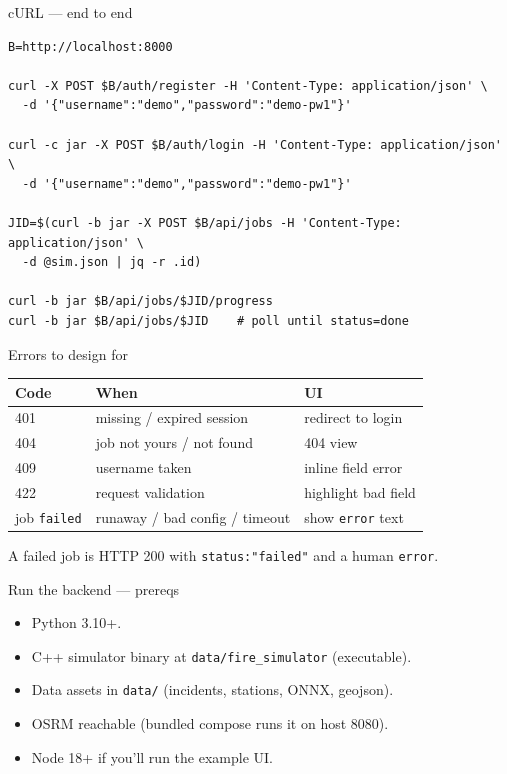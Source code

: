 \documentclass[aspectratio=169,11pt]{beamer}
\begin{document}
\begin{frame}[fragile]{cURL — end to end}
\begin{lstlisting}[language=shell]
B=http://localhost:8000

curl -X POST $B/auth/register -H 'Content-Type: application/json' \
  -d '{"username":"demo","password":"demo-pw1"}'

curl -c jar -X POST $B/auth/login -H 'Content-Type: application/json' \
  -d '{"username":"demo","password":"demo-pw1"}'

JID=$(curl -b jar -X POST $B/api/jobs -H 'Content-Type: application/json' \
  -d @sim.json | jq -r .id)

curl -b jar $B/api/jobs/$JID/progress
curl -b jar $B/api/jobs/$JID    # poll until status=done
\end{lstlisting}
\end{frame}

\begin{frame}{Errors to design for}
\small
\begin{tabular}{lll}
\textbf{Code} & \textbf{When} & \textbf{UI} \\\hline
401 & missing / expired session & redirect to login \\
404 & job not yours / not found & 404 view \\
409 & username taken & inline field error \\
422 & request validation & highlight bad field \\
\hline
job \texttt{failed} & runaway / bad config / timeout & show \texttt{error} text \\
\end{tabular}

\vspace{10pt}
\small A failed job is HTTP 200 with \texttt{status:"failed"} and a human \texttt{error}.
\end{frame}

\begin{frame}{Run the backend — prereqs}
  \begin{itemize}\setlength\itemsep{6pt}
    \item Python 3.10+.
    \item C++ simulator binary at \texttt{data/fire\_simulator} (executable).
    \item Data assets in \texttt{data/} (incidents, stations, ONNX, geojson).
    \item OSRM reachable (bundled compose runs it on host 8080).
    \item Node 18+ if you'll run the example UI.
  \end{itemize}
\end{frame}
\end{document}
